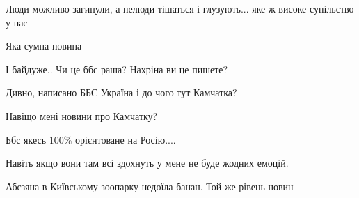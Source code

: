 \begin{itemize}
Люди можливо загинули, а нелюди тішаться і глузують... яке ж високе супільство у нас

 
Яка сумна новина

 
І байдуже.. Чи це ббс раша?
Нахріна ви це пишете?

 
Дивно, написано ББС Україна і до чого тут Камчатка?

 
Навіщо мені новини про Камчатку? 🙈🙈🙈


Ббс якесь 100\% орієнтоване на Росію....

 
Навіть якщо вони там всі здохнуть у мене не буде жодних емоцій.

 
Абєзяна в Київському зоопарку недоїла банан. Той же рівень новин

 

\end{itemize}
